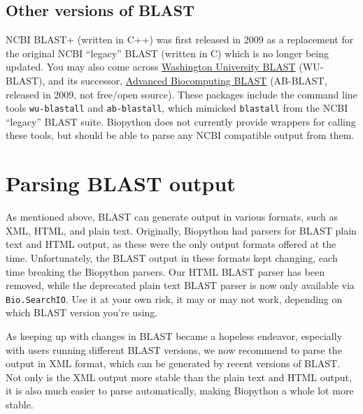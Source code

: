 \subsection{Other versions of BLAST}
\label{subsec:other-blast-versions}

NCBI BLAST+ (written in C++) was first released in 2009 as a replacement for
the original NCBI ``legacy'' BLAST (written in C) which is no longer being updated.
You may also come across \href{http://blast.wustl.edu/}{Washington University BLAST}
(WU-BLAST), and its successor, \href{https://blast.advbiocomp.com}{Advanced Biocomputing
BLAST} (AB-BLAST, released in 2009, not free/open source). These packages include
the command line tools \verb|wu-blastall| and \verb|ab-blastall|, which mimicked
\verb|blastall| from the NCBI ``legacy'' BLAST suite.
Biopython does not currently provide wrappers for calling these tools, but should be able
to parse any NCBI compatible output from them.

\section{Parsing BLAST output}
\label{sec:parsing-blast}

As mentioned above, BLAST can generate output in various formats, such as
XML, HTML, and plain text. Originally, Biopython had parsers for BLAST
plain text and HTML output, as these were the only output formats offered
at the time. Unfortunately, the BLAST output in these formats kept changing,
each time breaking the Biopython parsers. Our HTML BLAST parser has been
removed, while the deprecated plain text BLAST parser is now only available
via \verb|Bio.SearchIO|. Use it at your own risk, it may or may not work,
depending on which BLAST version you're using.

As keeping up with changes in BLAST
became a hopeless endeavor, especially with users running different BLAST
versions, we now recommend to parse the output in XML format, which can be
generated by recent versions of BLAST. Not only is the XML output more stable
than the plain text and HTML output, it is also much easier to parse
automatically, making Biopython a whole lot more stable.

